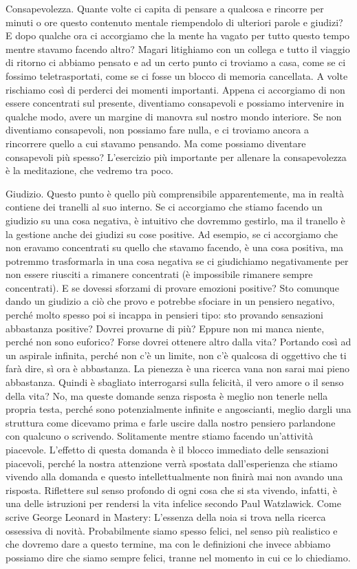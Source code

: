 \documentclass[12pt]{book} %
\begin{document}
Consapevolezza. Quante volte ci capita di pensare a qualcosa e rincorre per minuti o ore questo contenuto mentale
riempendolo di ulteriori parole e giudizi? E dopo qualche ora ci accorgiamo che la mente ha vagato per tutto questo
tempo mentre stavamo facendo altro? Magari litighiamo con un collega e tutto il viaggio di ritorno ci abbiamo pensato e
ad un certo punto ci troviamo a casa, come se ci fossimo teletrasportati, come se ci fosse un blocco di memoria
cancellata. A volte rischiamo così di perderci dei momenti importanti. Appena ci accorgiamo di non essere concentrati
sul presente, diventiamo consapevoli e possiamo intervenire in qualche modo, avere un margine di manovra sul nostro
mondo interiore. Se non diventiamo consapevoli, non possiamo fare nulla, e ci troviamo ancora a rincorrere quello a cui
stavamo pensando. Ma come possiamo diventare consapevoli più spesso? L'esercizio più importante
per allenare la consapevolezza è la meditazione, che vedremo tra poco.

Giudizio. Questo punto è quello più comprensibile apparentemente, ma in realtà contiene dei tranelli al suo interno. Se
ci accorgiamo che stiamo facendo un giudizio su una cosa negativa, è intuitivo che dovremmo gestirlo, ma il tranello è
la gestione anche dei giudizi su cose positive. Ad esempio, se ci accorgiamo che non eravamo concentrati su quello che
stavamo facendo, è una cosa positiva, ma potremmo trasformarla in una cosa negativa se ci giudichiamo negativamente per
non essere riusciti a rimanere concentrati (è impossibile rimanere sempre concentrati). E se dovessi sforzami di
provare emozioni positive? Sto comunque dando un giudizio a ciò che provo e potrebbe sfociare in un pensiero negativo,
perché molto spesso poi si incappa in pensieri tipo: sto provando sensazioni abbastanza positive? Dovrei provarne di
più? Eppure non mi manca niente, perché non sono euforico? Forse dovrei ottenere altro dalla vita? Portando così ad un
aspirale infinita, perché non c'è un limite, non c'è qualcosa di oggettivo che ti farà dire, sì ora è abbastanza. La
pienezza è una ricerca vana non sarai mai pieno abbastanza. Quindi è sbagliato interrogarsi sulla felicità, il vero
amore o il senso della vita? No, ma queste domande senza risposta è meglio non tenerle nella propria testa, perché sono
potenzialmente infinite e angoscianti, meglio dargli una struttura come dicevamo prima e farle uscire dalla nostro
pensiero parlandone con qualcuno o scrivendo. Solitamente mentre stiamo facendo un'attività
piacevole. L'effetto di questa domanda è il blocco immediato delle sensazioni piacevoli, perché la
nostra attenzione verrà spostata dall'esperienza che stiamo vivendo alla domanda e questo
intellettualmente non finirà mai non avando una risposta. Riflettere sul senso profondo di ogni cosa che si sta
vivendo, infatti, è una delle istruzioni per rendersi la vita infelice secondo Paul Watzlawick. Come scrive George
Leonard in Mastery: L'essenza della noia si trova nella ricerca ossessiva di novità. Probabilmente
siamo spesso felici, nel senso più realistico e che dovremo dare a questo termine, ma con le definizioni che invece
abbiamo possiamo dire che siamo sempre felici, tranne nel momento in cui ce lo chiediamo.
\end{document}
